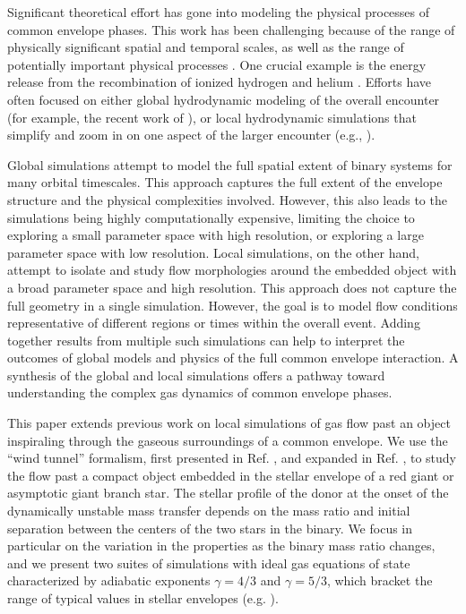 Significant theoretical effort has gone into modeling the physical processes of common envelope phases. This work has been challenging because of the range of physically significant spatial and temporal scales, as well as the range of potentially important physical processes \cite{1993PASP..105.1373I,2013A&ARv..21...59I}. One crucial example is the energy release from the recombination of ionized hydrogen and helium \cite{Nandez:2015,Ivanova:2016,Lucy:1967,Roxburgh:1967,Han:1994,Han:2002}.  Efforts have often focused on either global hydrodynamic modeling of the overall encounter (for example, the recent work of \cite{Ricker_2007,Passy_2011,Ricker_2012,Ohlmann:2016a,Ohlmann:2016b,Iaconi:2017,Iaconi:2018,Chamandy:2018,Chamandy:2018a,Reichardt:2019,Chamandy:2019psk,Fragos:2019box}), 
or local hydrodynamic simulations that simplify and zoom in on one aspect of the larger encounter (e.g., \cite{Fryxell:1987,Fryxell:1988,Taam:1989,Sandquist_1998,MacLeod_2015,MacLeod:2014yda,MacLeod:2017}). 

Global simulations attempt to model the full spatial extent of binary systems for many orbital timescales. This approach captures the full extent of the envelope structure and the physical complexities involved. However, this also leads to the simulations being highly computationally expensive, limiting the choice to exploring a small parameter space with high resolution, or exploring a large parameter space with low resolution. Local simulations, on the other hand, attempt to isolate and study flow morphologies around the embedded object with a broad parameter space and high resolution. This approach does not capture the full geometry in a single simulation. However, the goal is to model flow conditions representative of different regions or times within the overall event. Adding together results from multiple such simulations can help to interpret the outcomes of global models and physics of the full common envelope interaction.
A synthesis of the global and local simulations offers a pathway toward understanding the complex gas dynamics of common envelope phases.

This paper extends previous work on local simulations of gas flow past an object inspiraling through the gaseous surroundings of a common envelope. We use the ``wind tunnel'' formalism, first presented in Ref. \cite{MacLeod:2014yda}, and expanded in Ref. \cite{MacLeod:2017}, to study the flow past a compact object embedded in the stellar envelope of a red giant or asymptotic giant branch star. The stellar profile of the donor at the onset of the dynamically unstable mass transfer depends on the mass ratio and initial separation between the centers of the two stars in the binary. 
We focus in particular on the variation in the properties as the binary mass ratio changes, and we present two suites of simulations with ideal gas equations of state characterized by adiabatic exponents $\gamma = 4/3$ and $\gamma = 5/3$, which bracket the range of typical values in stellar envelopes (e.g. \cite{MacLeod:2017,Murguia-Berthier:2017}).

